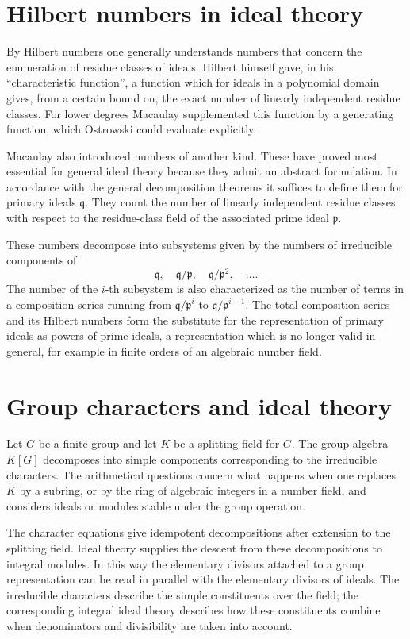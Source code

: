 \documentclass[12pt]{article}
\begin{document}
\section{Hilbert numbers in ideal theory}

By Hilbert numbers one generally understands numbers that concern the enumeration of residue classes of ideals. Hilbert himself gave, in his ``characteristic function'', a function which for ideals in a polynomial domain gives, from a certain bound on, the exact number of linearly independent residue classes. For lower degrees Macaulay supplemented this function by a generating function, which Ostrowski could evaluate explicitly.

Macaulay also introduced numbers of another kind. These have proved most essential for general ideal theory because they admit an abstract formulation. In accordance with the general decomposition theorems it suffices to define them for primary ideals $\mathfrak q$. They count the number of linearly independent residue classes with respect to the residue-class field of the associated prime ideal $\mathfrak p$.

These numbers decompose into subsystems given by the numbers of irreducible components of
\[
  \mathfrak q,
  \quad \mathfrak q/\mathfrak p,
  \quad \mathfrak q/\mathfrak p^2,
  \quad \ldots .
\]
The number of the $i$-th subsystem is also characterized as the number of terms in a composition series running from $\mathfrak q/\mathfrak p^i$ to $\mathfrak q/\mathfrak p^{i-1}$. The total composition series and its Hilbert numbers form the substitute for the representation of primary ideals as powers of prime ideals, a representation which is no longer valid in general, for example in finite orders of an algebraic number field.

\section{Group characters and ideal theory}

Let $G$ be a finite group and let $K$ be a splitting field for $G$. The group algebra $K[G]$ decomposes into simple components corresponding to the irreducible characters. The arithmetical questions concern what happens when one replaces $K$ by a subring, or by the ring of algebraic integers in a number field, and considers ideals or modules stable under the group operation.

The character equations give idempotent decompositions after extension to the splitting field. Ideal theory supplies the descent from these decompositions to integral modules. In this way the elementary divisors attached to a group representation can be read in parallel with the elementary divisors of ideals. The irreducible characters describe the simple constituents over the field; the corresponding integral ideal theory describes how these constituents combine when denominators and divisibility are taken into account.
\end{document}
